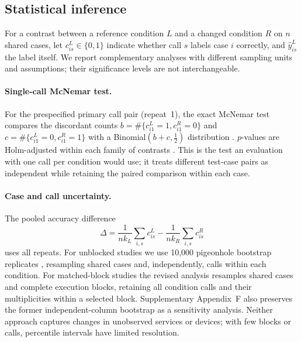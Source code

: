 \documentclass[11pt,a4paper]{article}
\begin{document}
\subsection{Statistical inference}\label{sec:stats}
For a contrast between a reference condition $L$ and a changed condition $R$ on $n$ shared cases, let $c^{L}_{is}\in\{0,1\}$ indicate whether call $s$ labels case $i$ correctly, and $\hat y^{L}_{is}$ the label itself. We report complementary analyses with different sampling units and assumptions; their significance levels are not interchangeable.

\paragraph{Single-call McNemar test.} For the prespecified primary call pair (repeat~1), the exact McNemar test compares the discordant counts $b=\#\{c^L_{i1}=1,c^R_{i1}=0\}$ and $c=\#\{c^L_{i1}=0,c^R_{i1}=1\}$ with a Binomial$(b+c,\tfrac12)$ distribution \citep{mcnemar1947note,dietterich1998approximate}. $p$-values are Holm-adjusted within each family of contrasts \citep{holm1979simple}. This is the test an evaluation with one call per condition would use; it treats different test-case pairs as independent while retaining the paired comparison within each case.

\paragraph{Case and call uncertainty.} The pooled accuracy difference
\begin{equation}
\Delta=\frac{1}{nk_L}\sum_{i,s}c^L_{is}-\frac{1}{nk_R}\sum_{i,s}c^R_{is}
\end{equation}
uses all repeats. For unblocked studies we use 10{,}000 pigeonhole bootstrap replicates \citep{owen2007pigeonhole}, resampling shared cases and, independently, calls within each condition. For matched-block studies the revised analysis resamples shared cases and complete execution blocks, retaining all condition calls and their multiplicities within a selected block. Supplementary Appendix~F also preserves the former independent-column bootstrap as a sensitivity analysis. Neither approach captures changes in unobserved services or devices; with few blocks or calls, percentile intervals have limited resolution.
\end{document}
